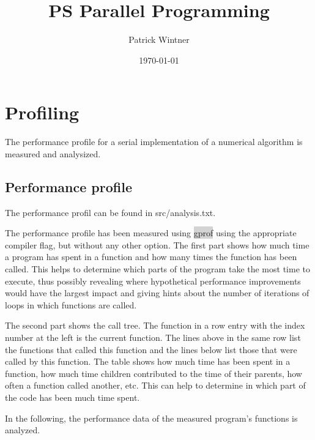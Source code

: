\documentclass[parskip]{scrartcl}
\title{PS Parallel Programming}
\author{Patrick Wintner}
\date{\today}
\begin{document}
	\maketitle
	
	\section{Profiling}
	\label{profiling}
	The performance profile for a serial implementation of a numerical algorithm is measured and analysized.
	\subsection{Performance profile}
	The performance profil can be found in src/analysis.txt.

	The performance profile has been measured using \colorbox{lightgray}{gprof} using the appropriate compiler flag, but without any other option. The first part shows how much time a program has spent in a function and how many times the function has been called. This helps to determine which parts of the program take the most time to execute, thus possibly revealing where hypothetical performance improvements would have the largest impact and giving hints about the number of iterations of loops in which functions are called.
	
	The second part shows the call tree. The function in a row entry with the index number at the left is the current function. The lines above in the same row list the functions that called this function and the lines below list those that were called by this function. The table shows how much time has been spent in a function, how much time children contributed to the time of their parents, how often a function called another, etc. This can help to determine in which part of the code has been much time spent.
	
	In the following, the performance data of the measured program's functions is analyzed.
	
\end{document}
